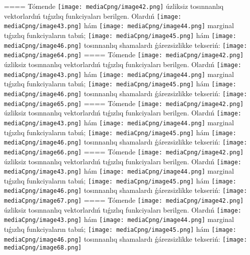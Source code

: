 ====
Tómende \texttt{[image: mediaCpng/image42.png]} úzliksiz tosınnanlıq vektorlardıń tıǵızlıq funkciyaları berilgen. Olardıń \texttt{[image: mediaCpng/image43.png]} hám \texttt{[image: mediaCpng/image44.png]} marginal tıǵızlıq funkciyaların tabıń; \texttt{[image: mediaCpng/image45.png]} hám \texttt{[image: mediaCpng/image46.png]} tosınnanlıq shamalardı ǵárezsizlikke tekseriń: \texttt{[image: mediaCpng/image64.png]}
====
Tómende \texttt{[image: mediaCpng/image42.png]} úzliksiz tosınnanlıq vektorlardıń tıǵızlıq funkciyaları berilgen. Olardıń \texttt{[image: mediaCpng/image43.png]} hám \texttt{[image: mediaCpng/image44.png]} marginal tıǵızlıq funkciyaların tabıń; \texttt{[image: mediaCpng/image45.png]} hám \texttt{[image: mediaCpng/image46.png]} tosınnanlıq shamalardı ǵárezsizlikke tekseriń: \texttt{[image: mediaCpng/image65.png]}
====
Tómende \texttt{[image: mediaCpng/image42.png]} úzliksiz tosınnanlıq vektorlardıń tıǵızlıq funkciyaları berilgen. Olardıń \texttt{[image: mediaCpng/image43.png]} hám \texttt{[image: mediaCpng/image44.png]} marginal tıǵızlıq funkciyaların tabıń; \texttt{[image: mediaCpng/image45.png]} hám \texttt{[image: mediaCpng/image46.png]} tosınnanlıq shamalardı ǵárezsizlikke tekseriń: \texttt{[image: mediaCpng/image66.png]}
====
Tómende \texttt{[image: mediaCpng/image42.png]} úzliksiz tosınnanlıq vektorlardıń tıǵızlıq funkciyaları berilgen. Olardıń \texttt{[image: mediaCpng/image43.png]} hám \texttt{[image: mediaCpng/image44.png]} marginal tıǵızlıq funkciyaların tabıń; \texttt{[image: mediaCpng/image45.png]} hám \texttt{[image: mediaCpng/image46.png]} tosınnanlıq shamalardı ǵárezsizlikke tekseriń: \texttt{[image: mediaCpng/image67.png]}
====
Tómende \texttt{[image: mediaCpng/image42.png]} úzliksiz tosınnanlıq vektorlardıń tıǵızlıq funkciyaları berilgen. Olardıń \texttt{[image: mediaCpng/image43.png]} hám \texttt{[image: mediaCpng/image44.png]} marginal tıǵızlıq funkciyaların tabıń; \texttt{[image: mediaCpng/image45.png]} hám \texttt{[image: mediaCpng/image46.png]} tosınnanlıq shamalardı ǵárezsizlikke tekseriń: \texttt{[image: mediaCpng/image68.png]}

